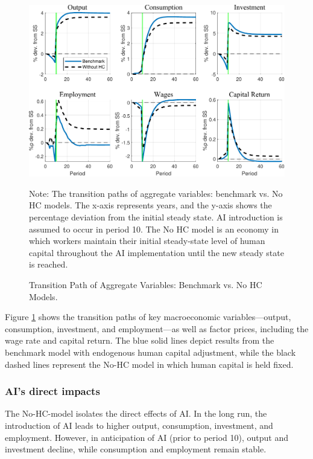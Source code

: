 \documentclass[12pt]{article}
\begin{document}
\begin{figure}
\begin{centering}
\caption{\protect\label{fig:no_hc_1}Transition Path of Aggregate Variables:
Benchmark vs. No HC Models.}
\includegraphics[width=0.9\linewidth]{figure_204040calib/nohc_agg.pdf}
\par\end{centering}


{\scriptsize Note:  The transition paths of aggregate variables: benchmark vs. No HC models. The x-axis represents years, and the y-axis shows the percentage deviation from the initial steady state. AI introduction is assumed to occur in period 10. The No HC model is an economy in which workers maintain their initial steady-state level of human capital throughout the AI implementation until the new steady state is reached. }{\scriptsize\par}
\end{figure}

Figure \ref{fig:no_hc_1} shows the transition paths of key macroeconomic variables—output, consumption, investment, and employment—as well as factor prices, including the wage rate and capital return. The blue solid lines depict results from the benchmark model with endogenous human capital adjustment, while the black dashed lines represent the No-HC model in which human capital is held fixed.

\subsubsection{AI's direct impacts}

The No-HC-model isolates the direct effects of AI. In the long run, the introduction of AI leads to higher output, consumption, investment, and employment. However, in anticipation of AI (prior to period 10), output and investment decline, while consumption and employment remain stable.
\end{document}
